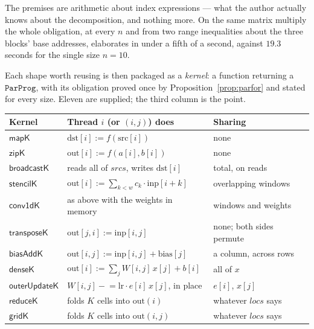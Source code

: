 \documentclass[11pt,a4paper]{article}
\theoremstyle{definition}
\theoremstyle{plain}
\theoremstyle{remark}
\begin{document}
The premises are arithmetic about index expressions --- what the author actually knows about
the decomposition, and nothing more. On the same matrix multiply the whole obligation, at
every $n$ and from two range inequalities about the three blocks' base addresses, elaborates
in under a fifth of a second, against $19.3$ seconds for the single size $n = 10$.

Each shape worth reusing is then packaged as a \emph{kernel}: a function returning a
$\texttt{ParProg}$, with its obligation proved once by Proposition~\ref{prop:parfor} and
stated for every size. Eleven are supplied; the third column is the point.

\begin{center}\small
\begin{tabular}{@{}lll@{}}
\toprule
\textbf{Kernel} & \textbf{Thread $i$ (or $(i,j)$) does} & \textbf{Sharing} \\
\midrule
$\mathsf{mapK}$        & $\mathrm{dst}[i] := f(\mathrm{src}[i])$                      & none \\
$\mathsf{zipK}$        & $\mathrm{out}[i] := f(a[i], b[i])$                           & none \\
$\mathsf{broadcastK}$  & reads all of $\mathit{srcs}$, writes $\mathrm{dst}[i]$       & total, on reads \\
$\mathsf{stencilK}$    & $\mathrm{out}[i] := \sum_{k<w} c_k \cdot \mathrm{inp}[i{+}k]$ & overlapping windows \\
$\mathsf{conv1dK}$     & as above with the weights in memory                          & windows and weights \\
$\mathsf{transposeK}$  & $\mathrm{out}[j,i] := \mathrm{inp}[i,j]$                     & none; both sides permute \\
$\mathsf{biasAddK}$    & $\mathrm{out}[i,j] := \mathrm{inp}[i,j] + \mathrm{bias}[j]$  & a column, across rows \\
$\mathsf{denseK}$      & $\mathrm{out}[i] := \sum_j W[i,j]\,x[j] + b[i]$              & all of $x$ \\
$\mathsf{outerUpdateK}$& $W[i,j] \mathrel{-}= \mathrm{lr}\cdot e[i]\,x[j]$, in place  & $e[i]$, $x[j]$ \\
$\mathsf{reduceK}$     & folds $K$ cells into $\mathrm{out}(i)$                       & whatever $\mathit{locs}$ says \\
$\mathsf{gridK}$       & folds $K$ cells into $\mathrm{out}(i,j)$                     & whatever $\mathit{locs}$ says \\
\bottomrule
\end{tabular}
\end{center}
\end{document}
